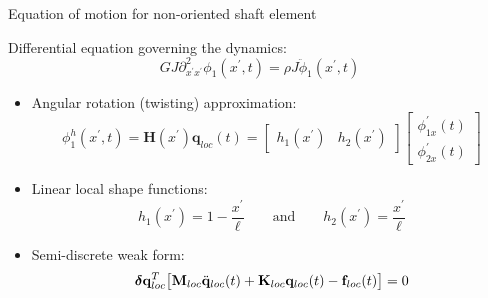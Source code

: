 \documentclass[aspectratio=169]{beamer}
\begin{document}
\begin{frame}{Equation of motion for non-oriented shaft element}
  \begin{block}{}
    Differential equation governing the dynamics:
    $$ GJ \partial^{2}_{x^\prime x^\prime}\phi_{1}(x^\prime, t) = \rho J \ddot{\phi}_1(x^\prime, t) $$
  \end{block}

  \begin{itemize}
    \item  Angular rotation (twisting) approximation:
          \[\phi^h_1(x^\prime,t)=  \mathbf H(x^\prime)\mathbf q_{loc} (t)=\begin{bmatrix}  h_1(x^\prime) & h_2(x^\prime)\end{bmatrix} \begin{bmatrix}  \phi_{1x}^\prime(t) \\ \phi_{2x}^\prime(t)\end{bmatrix}\]
    \item Linear local shape functions:
          $$h_1(x^\prime)  =1-\frac{x^\prime}{\ell} \qquad\text{and}\qquad h_2(x^\prime)  =\frac{x^\prime}{\ell}$$
    \item Semi-discrete weak form:
          \[\boldsymbol\delta\mathbf{q}_{loc}^T\big[\mathbf{M}_{loc} \ddot{\mathbf{q}}_{loc}(t) + \mathbf{K}_{loc} \mathbf{q}_{loc}(t) - \mathbf{f}_{loc}(t)\big]=0 \]
  \end{itemize}
\end{frame}
\end{document}
